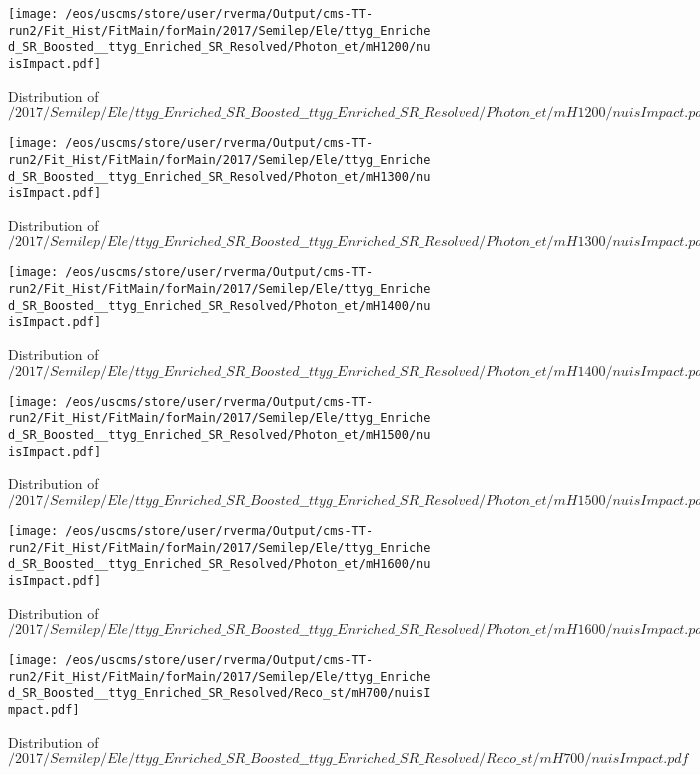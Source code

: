 \begin{figure}
\centering
\texttt{[image: /eos/uscms/store/user/rverma/Output/cms-TT-run2/Fit\_Hist/FitMain/forMain/2017/Semilep/Ele/ttyg\_Enriched\_SR\_Boosted\_\_ttyg\_Enriched\_SR\_Resolved/Photon\_et/mH1200/nuisImpact.pdf]}
\caption{Distribution of $/2017/Semilep/Ele/ttyg\_Enriched\_SR\_Boosted\_\_ttyg\_Enriched\_SR\_Resolved/Photon\_et/mH1200/nuisImpact.pdf$}
\end{figure}

\begin{figure}
\centering
\texttt{[image: /eos/uscms/store/user/rverma/Output/cms-TT-run2/Fit\_Hist/FitMain/forMain/2017/Semilep/Ele/ttyg\_Enriched\_SR\_Boosted\_\_ttyg\_Enriched\_SR\_Resolved/Photon\_et/mH1300/nuisImpact.pdf]}
\caption{Distribution of $/2017/Semilep/Ele/ttyg\_Enriched\_SR\_Boosted\_\_ttyg\_Enriched\_SR\_Resolved/Photon\_et/mH1300/nuisImpact.pdf$}
\end{figure}

\begin{figure}
\centering
\texttt{[image: /eos/uscms/store/user/rverma/Output/cms-TT-run2/Fit\_Hist/FitMain/forMain/2017/Semilep/Ele/ttyg\_Enriched\_SR\_Boosted\_\_ttyg\_Enriched\_SR\_Resolved/Photon\_et/mH1400/nuisImpact.pdf]}
\caption{Distribution of $/2017/Semilep/Ele/ttyg\_Enriched\_SR\_Boosted\_\_ttyg\_Enriched\_SR\_Resolved/Photon\_et/mH1400/nuisImpact.pdf$}
\end{figure}

\begin{figure}
\centering
\texttt{[image: /eos/uscms/store/user/rverma/Output/cms-TT-run2/Fit\_Hist/FitMain/forMain/2017/Semilep/Ele/ttyg\_Enriched\_SR\_Boosted\_\_ttyg\_Enriched\_SR\_Resolved/Photon\_et/mH1500/nuisImpact.pdf]}
\caption{Distribution of $/2017/Semilep/Ele/ttyg\_Enriched\_SR\_Boosted\_\_ttyg\_Enriched\_SR\_Resolved/Photon\_et/mH1500/nuisImpact.pdf$}
\end{figure}

\begin{figure}
\centering
\texttt{[image: /eos/uscms/store/user/rverma/Output/cms-TT-run2/Fit\_Hist/FitMain/forMain/2017/Semilep/Ele/ttyg\_Enriched\_SR\_Boosted\_\_ttyg\_Enriched\_SR\_Resolved/Photon\_et/mH1600/nuisImpact.pdf]}
\caption{Distribution of $/2017/Semilep/Ele/ttyg\_Enriched\_SR\_Boosted\_\_ttyg\_Enriched\_SR\_Resolved/Photon\_et/mH1600/nuisImpact.pdf$}
\end{figure}

\begin{figure}
\centering
\texttt{[image: /eos/uscms/store/user/rverma/Output/cms-TT-run2/Fit\_Hist/FitMain/forMain/2017/Semilep/Ele/ttyg\_Enriched\_SR\_Boosted\_\_ttyg\_Enriched\_SR\_Resolved/Reco\_st/mH700/nuisImpact.pdf]}
\caption{Distribution of $/2017/Semilep/Ele/ttyg\_Enriched\_SR\_Boosted\_\_ttyg\_Enriched\_SR\_Resolved/Reco\_st/mH700/nuisImpact.pdf$}
\end{figure}

